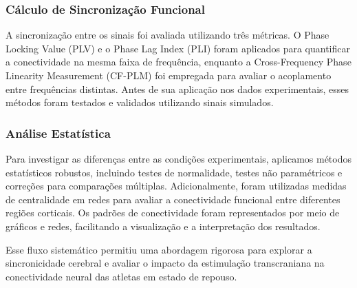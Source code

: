 \subsubsection{Cálculo de Sincronização Funcional}
A sincronização entre os sinais foi avaliada utilizando três métricas. O Phase Locking Value (PLV) e o Phase Lag Index (PLI) foram aplicados para quantificar a conectividade na mesma faixa de frequência, enquanto a Cross-Frequency Phase Linearity Measurement (CF-PLM) foi empregada para avaliar o acoplamento entre frequências distintas. Antes de sua aplicação nos dados experimentais, esses métodos foram testados e validados utilizando sinais simulados.

\subsubsection{Análise Estatística} Para investigar as diferenças entre as condições experimentais, aplicamos métodos estatísticos robustos, incluindo testes de normalidade, testes não paramétricos e correções para comparações múltiplas. Adicionalmente, foram utilizadas medidas de centralidade em redes para avaliar a conectividade funcional entre diferentes regiões corticais. Os padrões de conectividade foram representados por meio de gráficos e redes, facilitando a visualização e a interpretação dos resultados.

Esse fluxo sistemático permitiu uma abordagem rigorosa para explorar a sincronicidade cerebral e avaliar o impacto da estimulação transcraniana na conectividade neural das atletas em estado de repouso.
